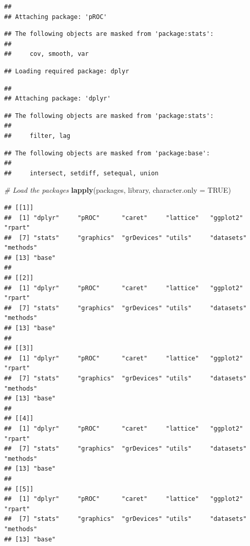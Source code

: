\documentclass[
]{article}
\newenvironment{Shaded}{\begin{snugshade}}{\end{snugshade}}
\newcommand{\AttributeTok}[1]{\textcolor[rgb]{0.13,0.29,0.53}{#1}}
\newcommand{\CommentTok}[1]{\textcolor[rgb]{0.56,0.35,0.01}{\textit{#1}}}
\newcommand{\ConstantTok}[1]{\textcolor[rgb]{0.56,0.35,0.01}{#1}}
\newcommand{\FunctionTok}[1]{\textcolor[rgb]{0.13,0.29,0.53}{\textbf{#1}}}
\newcommand{\NormalTok}[1]{#1}
\begin{document}
\begin{verbatim}
## 
## Attaching package: 'pROC'
\end{verbatim}

\begin{verbatim}
## The following objects are masked from 'package:stats':
## 
##     cov, smooth, var
\end{verbatim}

\begin{verbatim}
## Loading required package: dplyr
\end{verbatim}

\begin{verbatim}
## 
## Attaching package: 'dplyr'
\end{verbatim}

\begin{verbatim}
## The following objects are masked from 'package:stats':
## 
##     filter, lag
\end{verbatim}

\begin{verbatim}
## The following objects are masked from 'package:base':
## 
##     intersect, setdiff, setequal, union
\end{verbatim}

\begin{Shaded}
\begin{Highlighting}[]
\CommentTok{\# Load the packages}
\FunctionTok{lapply}\NormalTok{(packages, library, }\AttributeTok{character.only =} \ConstantTok{TRUE}\NormalTok{)}
\end{Highlighting}
\end{Shaded}

\begin{verbatim}
## [[1]]
##  [1] "dplyr"     "pROC"      "caret"     "lattice"   "ggplot2"   "rpart"    
##  [7] "stats"     "graphics"  "grDevices" "utils"     "datasets"  "methods"  
## [13] "base"     
## 
## [[2]]
##  [1] "dplyr"     "pROC"      "caret"     "lattice"   "ggplot2"   "rpart"    
##  [7] "stats"     "graphics"  "grDevices" "utils"     "datasets"  "methods"  
## [13] "base"     
## 
## [[3]]
##  [1] "dplyr"     "pROC"      "caret"     "lattice"   "ggplot2"   "rpart"    
##  [7] "stats"     "graphics"  "grDevices" "utils"     "datasets"  "methods"  
## [13] "base"     
## 
## [[4]]
##  [1] "dplyr"     "pROC"      "caret"     "lattice"   "ggplot2"   "rpart"    
##  [7] "stats"     "graphics"  "grDevices" "utils"     "datasets"  "methods"  
## [13] "base"     
## 
## [[5]]
##  [1] "dplyr"     "pROC"      "caret"     "lattice"   "ggplot2"   "rpart"    
##  [7] "stats"     "graphics"  "grDevices" "utils"     "datasets"  "methods"  
## [13] "base"
\end{verbatim}
\end{document}
